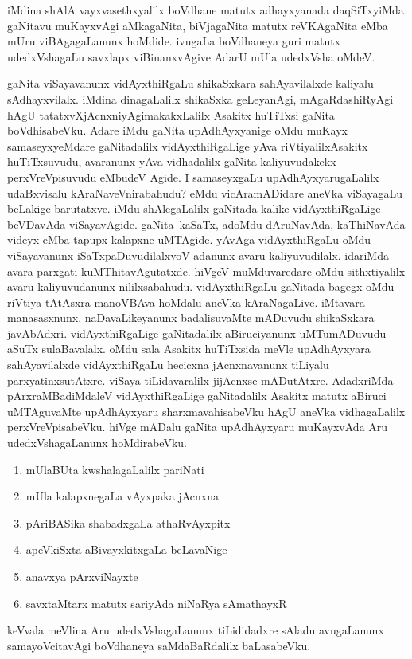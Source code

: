 iMdina shAlA vayxvasethxyalilx boVdhane matutx adhayxyanada daqSiTxyiMda gaNitavu muKayxvAgi aMkagaNita, biVjagaNita matutx reVKAgaNita eMba mUru viBAgagaLanunx hoMdide. ivugaLa boVdhaneya guri matutx udedxVshagaLu savxlapx viBinanxvAgive AdarU mUla udedxVsha oMdeV.

gaNita viSayavanunx vidAyxthiRgaLu shikaSxkara sahAyavilalxde kaliyalu sAdhayxvilalx. iMdina dinagaLalilx shikaSxka geLeyanAgi, mAgaRdashiRyAgi hAgU tatatxvXjAcnxniyAgi\break makakxLalilx Asakitx huTiTxsi gaNita boVdhisabeVku. Adare iMdu gaNita upAdhAyxyanige oMdu muKayx samaseyxyeMdare gaNitadalilx vidAyxthiRgaLige yAva riVtiyalilx\break Asakitx huTiTxsuvudu, avaranunx yAva vidhadalilx gaNita kaliyuvudakekx perxVreVpisuvudu eMbudeV Agide. I samaseyxgaLu upAdhAyxyarugaLalilx udaBxvisalu kAraNaveV\-nirabahudu? eMdu vicAramADidare aneVka viSayagaLu beLakige barutatxve. iMdu shAlegaLalilx gaNitada kalike vidAyxthiRgaLige beVDavAda viSayavAgide. gaNita~kaSaTx, adoMdu dAruNavAda, kaThiNavAda videyx eMba tapupx kalapxne uMTAgide. yAvAga vidAyxthiRgaLu oMdu viSayavanunx iSaTxpaDuvudilalxvoV adanunx avaru kaliyuvudilalx. idariMda avara parxgati kuMThitavAgutatxde. hiVgeV muMduvaredare oMdu sithxtiyalilx avaru kaliyuvudanunx nililxsabahudu. vidAyxthiRgaLu gaNitada bagegx oMdu riVtiya tAtAsxra manoVBAva hoMdalu aneVka kAraNagaLive. iMtavara manasasxnunx, naDavaLikeyanunx badalisuvaMte mADuvudu shikaSxkara javAbAdxri. vidAyxthiRgaLige gaNitadalilx aBiruciyanunx uMTumADuvudu aSuTx sulaBavalalx. oMdu sala Asakitx huTiTxsida meVle upAdhAyxyara sahAyavilalxde vidAyxthiRgaLu hecicxna jAcnxnavanunx tiLiyalu parxyatinxsutAtxre. viSaya tiLidavaralilx jijAcnxse mADutAtxre. AdadxriMda pArxraMBadiMdaleV vidAyxthiRgaLige gaNitadalilx Asakitx matutx aBiruci uMTAguvaMte upAdhAyxyaru sharxmavahisabeVku hAgU aneVka vidhagaLalilx perxVreVpisabeVku. hiVge mADalu gaNita upAdhAyxyaru muKayxvAda Aru udedxVsha\-gaLanunx hoMdirabeVku.
\begin{enumerate}[{\rm 1.}]
\item mUlaBUta kwshalagaLalilx pariNati
\item mUla kalapxnegaLa vAyxpaka jAcnxna
\item pAriBASika shabadxgaLa athaRvAyxpitx
\item apeVkiSxta aBivayxkitxgaLa beLavaNige
\item anavxya pArxviNayxte
\item savxtaMtarx matutx sariyAda niNaRya sAmathayxR
\end{enumerate}

keVvala meVlina Aru udedxVshagaLanunx tiLididadxre sAladu avugaLanunx sama\-yoVcitavAgi boVdhaneya saMdaBaRdalilx baLasabeVku.

